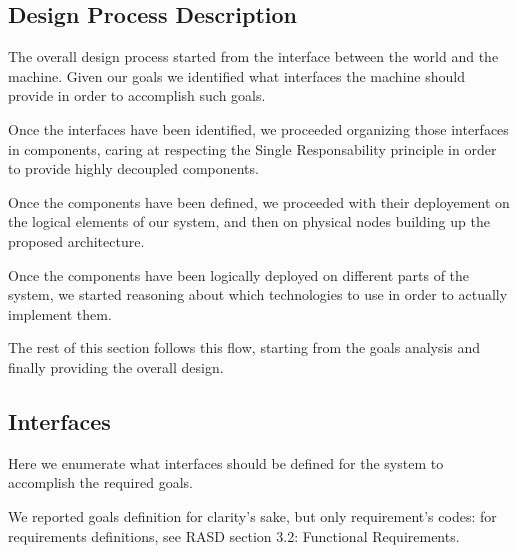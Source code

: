 \documentclass[11pt]{article} %
\begin{document}
\subsection{Design Process Description}

The overall design process started from the interface between the world and the machine. Given our goals we identified what interfaces the machine should provide in order to accomplish such goals.

Once the interfaces have been identified, we proceeded organizing those interfaces in components, caring at respecting the Single Responsability principle in order to provide highly decoupled components.

Once the components have been defined, we proceeded with their deployement on the logical elements of our system, and then on physical nodes building up the proposed architecture.

Once the components have been logically deployed on different parts of the system, we started reasoning about which technologies to use in order to actually implement them.

The rest of this section follows this flow, starting from the goals analysis and finally providing the overall design.


\subsection{Interfaces}

Here we enumerate what interfaces should be defined for the system to accomplish the required goals. 

We reported goals definition for clarity's sake, but only requirement's codes: for requirements definitions, see RASD section 3.2: Functional Requirements.
\end{document}
